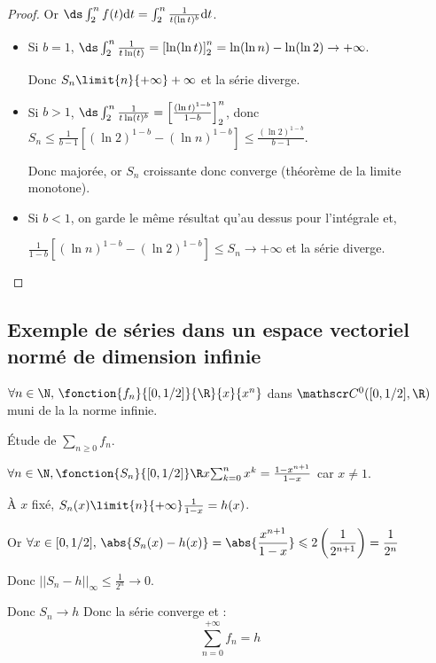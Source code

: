 \begin{proof}
    Or $\ds \int_{2}^{n} f(t) \text d t = \int_{2}^{n} \frac 1 {t (\ln t)^b} \text d t$.

    \begin{itemize}
        \item Si $b = 1$,
        $\ds \int_2^n \frac 1 {t\ln(t)} = \left[ \ln(\ln t) \right]_{2}^{n} = \ln(\ln n) - \ln(\ln 2) \to + \infty$.
        
        Donc $S_n \limit{n}{+ \infty} + \infty$ et la série diverge.

        \item Si $b > 1$, 
        $\ds \int_2^n \frac 1 {t\ln(t)^b} = \left[ \frac{(\ln t)^{1 - b}}{1 - b} \right]_{2}^{n}$, 
        donc $S_n \leqslant \frac 1 {b - 1} \left[ (\ln 2)^{1 - b} - (\ln n)^{1 - b} \right] \leqslant \frac{(\ln 2)^{1 - b}}{b - 1}$.

        Donc majorée, or $S_n$ croissante donc converge (théorème de la limite monotone).

        \item Si $b < 1$, on garde le même résultat qu'au dessus pour l'intégrale et,
        
        $\frac 1 {1 - b} \left[ (\ln n)^{1 - b} - (\ln 2)^{1 - b} \right] \leqslant S_n \to + \infty$
        et la série diverge. 
    \end{itemize}
\end{proof}

\subsection{Exemple de séries dans un espace vectoriel normé de dimension infinie}

$\forall n \in \N, \, \fonction{f_n}{[0, 1 / 2]}{\R}{x}{x^n}$ dans $\mathscr C^0([0, 1 / 2], \R)$ 
muni de la la norme infinie. 

Étude de $\sum_{n \geqslant 0} f_n$.

\avspace $\forall n \in \N, \fonction{S_n}{[0, 1 / 2]} \R x {\sum_{k = 0}^n x^k = \frac{1 - x^{n + 1}}{1 - x}}$ car $x \neq 1$. 

\avspace À $x$ fixé, $S_n(x) \limit{n}{+ \infty} \frac 1 {1 - x} = h(x)$.

Or $\displaystyle \forall x \in [0, 1 / 2], \, \abs{S_n(x) - h(x)} = \abs{\frac{x^{n + 1}}{1 - x}} \leqslant 2 \left( \frac 1 {2^{n + 1}} \right) = \frac 1 {2^n}$

Donc $|| S_n - h ||_\infty \leqslant \frac 1 {2^n} \longrightarrow 0$.

Donc $S_n \longrightarrow h$ Donc la série converge et :
\[\sum_{n = 0}^{+\infty} f_n = h\]

